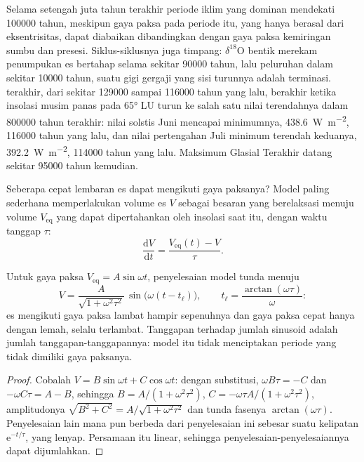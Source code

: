 Selama setengah juta tahun terakhir periode iklim yang dominan mendekati \num{100000} tahun,
meskipun gaya paksa pada periode itu, yang hanya berasal dari eksentrisitas, dapat diabaikan
dibandingkan dengan gaya paksa kemiringan sumbu dan presesi. Siklus-siklusnya juga timpang: $\delta^{18}$O bentik
merekam penumpukan es bertahap selama sekitar \num{90000} tahun, lalu peluruhan dalam sekitar
\num{10000} tahun, suatu gigi gergaji yang sisi turunnya adalah terminasi.  terakhir, dari
sekitar \num{129000} sampai \num{116000} tahun yang lalu, berakhir ketika insolasi musim panas pada \ang{65} LU turun
ke salah satu nilai terendahnya dalam \num{800000} tahun terakhir: nilai solstis Juni mencapai
minimumnya, \qty{438.6}{W.m^{-2}}, \num{116000} tahun yang lalu, dan nilai pertengahan Juli minimum terendah keduanya,
\qty{392.2}{W.m^{-2}}, \num{114000} tahun yang lalu. Maksimum Glasial Terakhir datang sekitar
\num{95000} tahun kemudian.

Seberapa cepat lembaran es dapat mengikuti gaya paksanya? Model paling sederhana memperlakukan volume es $V$ sebagai
besaran yang berelaksasi menuju volume $V_{\mathrm{eq}}$ yang dapat dipertahankan oleh insolasi saat itu, dengan
waktu tanggap $\tau$:
\[
  \frac{\mathrm dV}{\mathrm dt} = \frac{V_{\mathrm{eq}}(t) - V}{\tau} .
\]

\begin{proposition}\label{prop:b2:orbital-forcing:lag}
Untuk gaya paksa $V_{\mathrm{eq}} = A\sin\omega t$, penyelesaian model tunda menuju
\[
  V = \frac{A}{\sqrt{1 + \omega^2\tau^2}}\,\sin\bigl(\omega(t - t_{\ell})\bigr),\qquad
  t_{\ell} = \frac{\arctan(\omega\tau)}{\omega} :
\]
es mengikuti gaya paksa lambat hampir sepenuhnya dan gaya paksa cepat hanya dengan lemah, selalu terlambat. Tanggapan
terhadap jumlah sinusoid adalah jumlah tanggapan-tanggapannya: model itu tidak menciptakan periode yang tidak dimiliki
gaya paksanya.
\end{proposition}

\begin{proof}
Cobalah $V = B\sin\omega t + C\cos\omega t$: dengan substitusi, $\omega B\tau = -C$ dan $-\omega C\tau = A -
B$, sehingga $B = A/(1 + \omega^2\tau^2)$, $C = -\omega\tau A/(1 + \omega^2\tau^2)$, amplitudonya
$\sqrt{B^2 + C^2} = A/\sqrt{1 + \omega^2\tau^2}$ dan tunda fasenya $\arctan(\omega\tau)$. Penyelesaian
lain mana pun berbeda dari penyelesaian ini sebesar suatu kelipatan $\mathrm e^{-t/\tau}$, yang lenyap. Persamaan itu
linear, sehingga penyelesaian-penyelesaiannya dapat dijumlahkan.
\end{proof}

